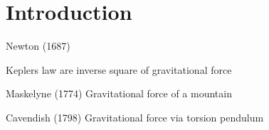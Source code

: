 \chapter{Introduction}\label{cha:introduction}


Newton (1687)

Keplers law are inverse square of gravitational force

Maskelyne (1774) Gravitational force of a mountain \cite{Maskelyne_1775,Davies_1985}

Cavendish (1798) Gravitational force via torsion pendulum





